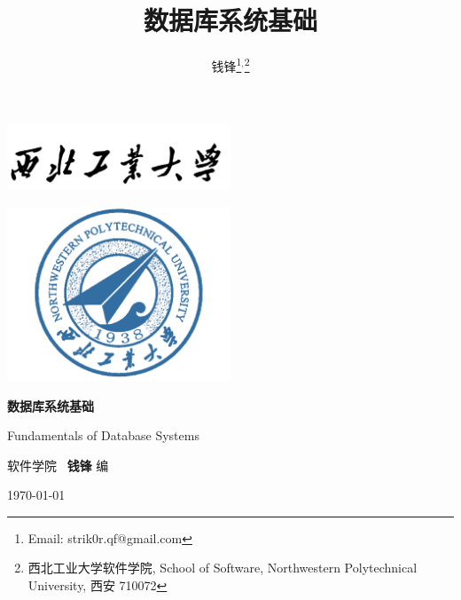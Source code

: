 \documentclass[10pt,UTF8]{book} %
\title{\textbf{数据库系统基础}}
\author{钱锋\thanks{Email: strik0r.qf@gmail.com}${}^,$\thanks{
    西北工业大学软件学院, School of Software, Northwestern Polytechnical University, 西安 710072
}}
\begin{document}

\pagestyle{empty}
\begin{titlepage}
    \thispagestyle{empty}
    \centering
        \vspace*{2cm}
        \includegraphics[width=0.5\textwidth]{pic/npu_2.png}\par
        \vspace{1em}
        \includegraphics[width=0.5\textwidth]{pic/npu_1.png}\par
    \vspace{1em}
        \begin{center}
            \Huge \heiti \textbf{数据库系统基础}

            Fundamentals of Database Systems
        \end{center}
        \vspace{17em}
        \begin{center}
        \songti
        \kaishu 软件学院 \, \heiti\textbf{钱锋} \quad \songti 编
        \vspace{0.5em}

    \today
    \end{center}
\end{titlepage}
\cleardoublepage
\maketitle
\cleardoublepage

\frontmatter
\newpage
\pagestyle{plain}
\makeatother

\pagestyle{plain}
{\small \tableofcontents}
\newpage
\thispagestyle{empty}
\cleardoublepage %
\end{document}

